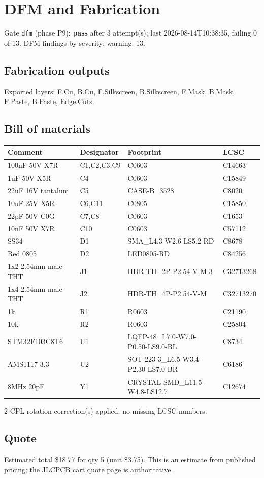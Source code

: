 \documentclass[11pt,a4paper]{article}
\begin{document}
\section{DFM and Fabrication}
Gate \texttt{dfm} (phase P9): \textbf{pass} after 3 attempt(s); last 2026-08-14T10:38:35, failing 0 of 13.
DFM findings by severity: warning: 13.
\subsection*{Fabrication outputs}
Exported layers: F.Cu, B.Cu, F.Silkscreen, B.Silkscreen, F.Mask, B.Mask, F.Paste, B.Paste, Edge.Cuts.
\subsection*{Bill of materials}
{\small
\begin{longtable}{p{4.4cm}p{2.8cm}p{4.6cm}l}
\toprule
\textbf{Comment} & \textbf{Designator} & \textbf{Footprint} & \textbf{LCSC} \\
\midrule
\endhead
100nF 50V X7R & C1,C2,C3,C9 & C0603 & C14663 \\
1uF 50V X5R & C4 & C0603 & C15849 \\
22uF 16V tantalum & C5 & CASE-B\_3528 & C8020 \\
10uF 25V X5R & C6,C11 & C0805 & C15850 \\
22pF 50V C0G & C7,C8 & C0603 & C1653 \\
10nF 50V X7R & C10 & C0603 & C57112 \\
SS34 & D1 & SMA\_L4.3-W2.6-LS5.2-RD & C8678 \\
Red 0805 & D2 & LED0805-RD & C84256 \\
1x2 2.54mm male THT & J1 & HDR-TH\_2P-P2.54-V-M-3 & C32713268 \\
1x4 2.54mm male THT & J2 & HDR-TH\_4P-P2.54-V-M & C32713270 \\
1k & R1 & R0603 & C21190 \\
10k & R2 & R0603 & C25804 \\
STM32F103C8T6 & U1 & LQFP-48\_L7.0-W7.0-P0.50-LS9.0-BL & C8734 \\
AMS1117-3.3 & U2 & SOT-223-3\_L6.5-W3.4-P2.30-LS7.0-BR & C6186 \\
8MHz 20pF & Y1 & CRYSTAL-SMD\_L11.5-W4.8-LS12.7 & C12674 \\
\bottomrule
\end{longtable}
}
2 CPL rotation correction(s) applied; no missing LCSC numbers.
\subsection*{Quote}
Estimated total \$18.77 for qty 5 (unit \$3.75). This is an estimate from published pricing; the JLCPCB cart quote page is authoritative.
\end{document}
